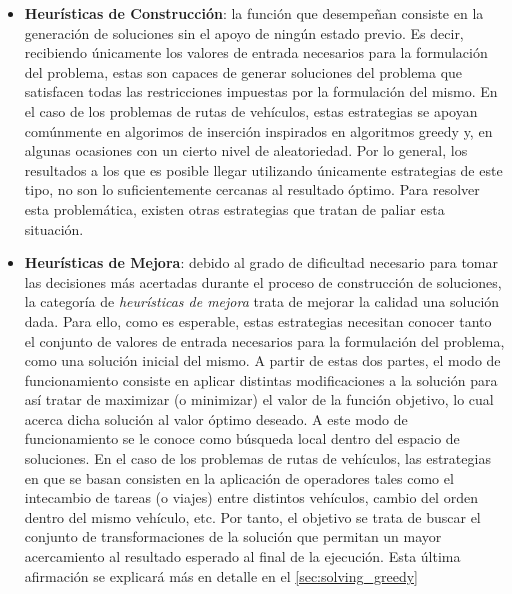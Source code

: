 \documentclass{subfiles}
\begin{document}
      \begin{itemize}

          \item \textbf{Heurísticas de Construcción}: la función que desempeñan consiste en la generación de soluciones sin el apoyo de ningún estado previo. Es decir, recibiendo únicamente los valores de entrada necesarios para la formulación del problema, estas son capaces de generar soluciones del problema que satisfacen todas las restricciones impuestas por la formulación del mismo. En el caso de los problemas de rutas de vehículos, estas estrategias se apoyan comúnmente en algorimos de inserción inspirados en algoritmos greedy y, en algunas ocasiones con un cierto nivel de aleatoriedad. Por lo general, los resultados a los que es posible llegar utilizando únicamente estrategias de este tipo, no son lo suficientemente cercanas al resultado óptimo. Para resolver esta problemática, existen otras estrategias que tratan de paliar esta situación.

          \item \textbf{Heurísticas de Mejora}: debido al grado de dificultad necesario para tomar las decisiones más acertadas durante el proceso de construcción de soluciones, la categoría de \emph{heurísticas de mejora} trata de mejorar la calidad una solución dada. Para ello, como es esperable, estas estrategias necesitan conocer tanto el conjunto de valores de entrada necesarios para la formulación del problema, como una solución inicial del mismo. A partir de estas dos partes, el modo de funcionamiento consiste en aplicar distintas modificaciones a la solución para así tratar de maximizar (o minimizar) el valor de la función objetivo, lo cual acerca dicha solución al valor óptimo deseado. A este modo de funcionamiento se le conoce como búsqueda local dentro del espacio de soluciones. En el caso de los problemas de rutas de vehículos, las estrategias en que se basan consisten en la aplicación de operadores tales como el intecambio de tareas (o viajes) entre distintos vehículos, cambio del orden dentro del mismo vehículo, etc. Por tanto, el objetivo se trata de buscar el conjunto de transformaciones de la solución que permitan un mayor acercamiento al resultado esperado al final de la ejecución. Esta última afirmación se explicará más en detalle en el \cref{sec:solving_greedy}

      \end{itemize}
\end{document}
